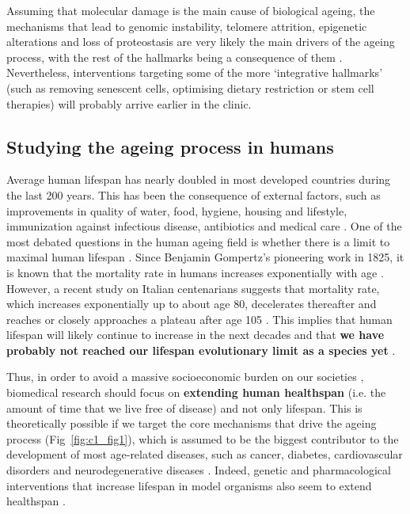 \bigskip

Assuming that molecular damage is the main cause of biological ageing, the mechanisms that lead to genomic instability, telomere attrition, epigenetic alterations and loss of proteostasis are very likely the main drivers of the ageing process, with the rest of the hallmarks being a consequence of them \cite{Lopez-Otin2013}. Nevertheless, interventions targeting some of the more `integrative hallmarks' (such as removing senescent cells, optimising dietary restriction or stem cell therapies) will probably arrive earlier in the clinic.

\smallskip

\subsection{Studying the ageing process in humans}

\smallskip

Average human lifespan has nearly doubled in most developed countries during the last 200 years. This has been the consequence of external factors, such as improvements in quality of water, food, hygiene, housing and lifestyle, immunization against infectious disease, antibiotics and medical care \cite{Partridge2018}. One of the most debated questions in the human ageing field is whether there is a limit to maximal human lifespan \cite{Dong2016}. Since Benjamin Gompertz's pioneering work in 1825, it is known that the mortality rate in humans increases exponentially with age \cite{Gompertz1825}. However, a recent study on Italian centenarians suggests that mortality rate, which increases exponentially up to about age 80, decelerates thereafter and reaches or closely approaches a plateau after age 105 \cite{Barbi2018}. This implies that human lifespan will likely continue to increase in the next decades and that \textbf{we have probably not reached our lifespan evolutionary limit as a species yet} \cite{Barbi2018,Kontis2017}. 

\bigskip

Thus, in order to avoid a massive socioeconomic burden on our societies \cite{Fine2014}, biomedical research should focus on \textbf{extending human healthspan} (i.e. the amount of time that we live free of disease) and not only lifespan. This is theoretically possible if we target the core mechanisms that drive the ageing process (Fig~\ref{fig:c1_fig1}), which is assumed to be the biggest contributor to the development of most age-related diseases, such as cancer, diabetes, cardiovascular disorders and neurodegenerative diseases \cite{Lopez-Otin2013}. Indeed, genetic and pharmacological interventions that increase lifespan in model organisms also seem to extend healthspan \cite{NewellStamper2018}.  

